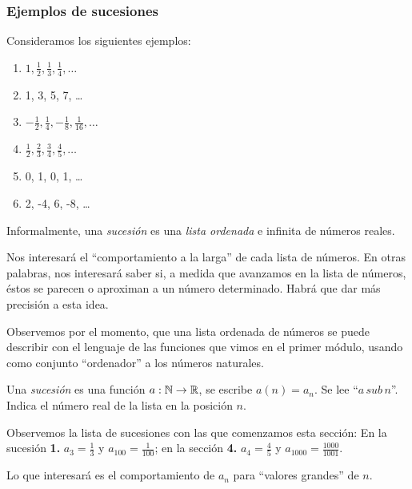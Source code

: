 \documentclass[../teoria.root.tex]{subfiles}
\begin{document}
\subsubsection{Ejemplos de sucesiones}
Consideramos los siguientes ejemplos:
\begin{enumerate}
    \item \(1,\frac{1}{2},\frac{1}{3},\frac{1}{4},\dots\)
    \item 1, 3, 5, 7, \dots
    \item \(-\frac{1}{2},\frac{1}{4},-\frac{1}{8},\frac{1}{16},\dots\)
    \item \(\frac{1}{2},\frac{2}{3},\frac{3}{4},\frac{4}{5},\dots\)
    \item 0, 1, 0, 1, \dots
    \item 2, -4, 6, -8, \dots
\end{enumerate}
Informalmente, una \textit{sucesión} es una \textit{lista ordenada} e infinita de números reales.

Nos interesará el “comportamiento a la larga” de cada lista de números.
En otras palabras, nos interesará saber si, a medida que avanzamos en la lista de números, éstos se parecen o aproximan a un número determinado.
Habrá que dar más precisión a esta idea.

Observemos por el momento, que una lista ordenada de números se puede describir con el lenguaje de las funciones que vimos en el primer módulo, usando como conjunto “ordenador” a los números naturales.

Una \textit{sucesión} es una función \(a:\mathbb{N}\rightarrow\mathbb{R}\), se escribe \(a(n)=a_n\).
Se lee “\(a\,sub\,n\)”.
Indica el número real de la lista en la posición \(n\).

Observemos la lista de sucesiones con las que comenzamos esta sección:
En la sucesión \textbf{1.} \(a_3=\frac{1}{3}\) y \(a_{100}=\frac{1}{100}\); en la sección \textbf{4.} \(a_4=\frac{4}{5}\) y \(a_{1000}=\frac{1000}{1001}\).

Lo que interesará es el comportamiento de \(a_n\) para “valores grandes” de \(n\).
\end{document}
